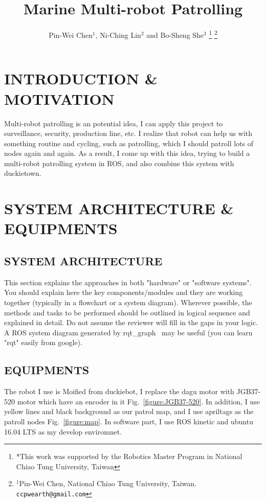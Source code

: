 \documentclass[letterpaper, 10 pt, conference]{ieeeconf}  %
\title{\LARGE \bf
Marine Multi-robot Patrolling
}
\author{Pin-Wei Chen$^{1}$, Ni-Ching Lin$^{2}$ and Bo-Sheng She$^{3}$ %
\thanks{*This work was supported by the Robotics Master Program in National Chiao Tung University, Taiwan}%
\thanks{$^{1}$Pin-Wei Chen, National Chiao Tung University, Taiwan.		{\tt\small ccpwearth@gmail.com}}%
}
\begin{document}
\maketitle
\thispagestyle{empty}
\pagestyle{empty}


\section{INTRODUCTION \& MOTIVATION}

Multi-robot patrolling is an potential idea, I can apply this project to surveillance, security, production line, etc. I realize that robot can help us with something routine and cycling, such as patrolling, which I should patroll lots of nodes again and again. As a result, I come up with this idea, trying to build a multi-robot patrolling system in ROS, and also combine this system with duckietown.

\section{SYSTEM ARCHITECTURE \& EQUIPMENTS}

\subsection{SYSTEM ARCHITECTURE}


This section explains the approaches in both "hardware" or "software systems". You should explain here the key components/modules and they are working together (typically in a flowchart or a system diagram). Wherever possible, the methods and tasks to be performed should be outlined in logical sequence and explained in detail. Do not assume the reviewer will fill in the gaps in your logic. A ROS system diagram generated by rqt\_graph~\cite{rqt-graph} may be useful (you can learn "rqt" easily from google).

\subsection{EQUIPMENTS} 

The robot I use is Moified from duckiebot, I replace the dagu motor with JGB37-520 motor which have an encoder in it Fig.~\ref{figure:JGB37-520}. In addition, I use yellow lines and black background as our patrol map, and I use apriltags as the patroll nodes Fig.~\ref{figure:map}. In software part, I use ROS kinetic and ubuntu 16.04 LTS as my develop enviromnet.
\end{document}
